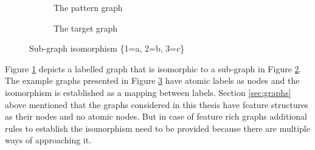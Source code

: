     \begin{figure}[!ht]
        \centering
        \begin{subfigure}[t]{0.48\textwidth}
            \centering
            \caption{The pattern graph}
            \label{fig:example-matching1}
        \end{subfigure}
        \begin{subfigure}[t]{0.48\textwidth}
            \centering
            \caption{The target graph}
            \label{fig:example-matching2}
        \end{subfigure}
        \caption{Sub-graph isomorphism \{1=a, 2=b, 3=c\}}
        \label{fig:example-matching}
    \end{figure}

    Figure \ref{fig:example-matching1} depicts a labelled graph that is isomorphic to a sub-graph in Figure \ref{fig:example-matching2}. The example graphs presented in Figure \ref{fig:example-matching} have atomic labels as nodes and the isomorphism is established as a mapping between labels. Section \ref{sec:graphs} above mentioned that the graphs considered in this thesis have feature structures as their nodes and no atomic nodes. But in case of feature rich graphs additional rules to establish the isomorphism need to be provided because there are multiple ways of approaching it. 

